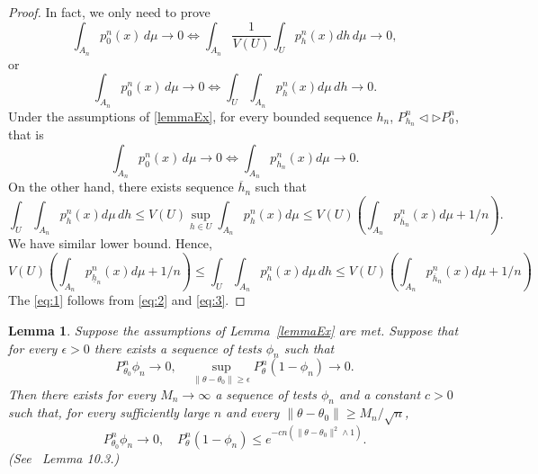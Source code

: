 \documentclass[review]{elsarticle}
\newtheorem{lemma}{Lemma}
\begin{document}
\begin{proof}
In fact, we only need to prove
\begin{equation}
\int_{A_n}p_0^n(x)\, d\mu \to 0 \Leftrightarrow \int_{A_n}\frac{1}{V(U)}\int_U p_h^n(x) dh \, d\mu \to 0,
\end{equation}
or
\begin{equation}\label{eq:1}
\int_{A_n}p_0^n(x)\, d\mu \to 0 \Leftrightarrow \int_{U}\int_{A_n} p_h^n(x) d\mu \, dh \to 0.
\end{equation}
Under the assumptions of \ref{lemmaEx}, for every bounded sequence $h_n$, $P_{h_n}^n\triangleleft \triangleright P_{0}^n$, that is
\begin{equation}\label{eq:2}
\int_{A_n}p_0^n(x)\, d\mu \to 0 \Leftrightarrow \int_{A_n} p_{h_n}^n(x) d\mu  \to 0.
\end{equation}
On the other hand, there exists sequence $\overline{h}_n$ such that
\begin{equation}
\int_{U}\int_{A_n} p_h^n(x) d\mu \, dh
\leq V(U)\sup_{h\in U}\int_{A_n} p_h^n(x) d\mu
\leq V(U)(\int_{A_n}p^n_{\overline{h}_n}(x)d\mu +1/n).
\end{equation}
 We have similar lower bound. Hence,
\begin{equation}\label{eq:3}
 V(U)(\int_{A_n}p^n_{\underline{h}_n}(x)d\mu +1/n)
\leq \int_{U}\int_{A_n} p_h^n(x) d\mu \, dh
\leq V(U)(\int_{A_n}p^n_{\overline{h}_n}(x)d\mu +1/n)
\end{equation}
The \eqref{eq:1} follows from \eqref{eq:2} and \eqref{eq:3}.
\end{proof}

\begin{lemma}\label{lemmaTest}
    Suppose the assumptions of Lemma~\ref{lemmaEx} are met. Suppose that for every $\epsilon>0$ there exists a sequence of tests $\phi_n$ such that
$$
P_{\theta_0}^n \phi_n \to 0,\quad \sup_{\|\theta-\theta_0\|\geq \epsilon}P_{\theta}^n (1-\phi_n)\to 0.
$$
Then there exists for every $M_n\to \infty$ a sequence of tests $\phi_n$ and a constant $c>0$ such that, for every sufficiently large $n$ and every $\|\theta-\theta_0\|\geq M_n /\sqrt{n}$,
$$
P_{\theta_0}^n\phi_n \to 0, \quad P_\theta^n (1-\phi_n)\leq e^{-cn(\|\theta-\theta_0\|^2\wedge 1)}.
$$
    (See~\cite{van2000asymptotic} Lemma 10.3.)
\end{lemma}
\end{document}
